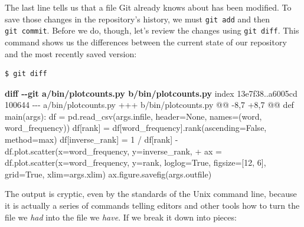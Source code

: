 \documentclass[
]{krantz}
\makeatletter
\newenvironment{Shaded}{\begin{snugshade}}{\end{snugshade}}
\newcommand{\DataTypeTok}[1]{\textcolor[rgb]{0.13,0.29,0.53}{#1}}
\newcommand{\KeywordTok}[1]{\textcolor[rgb]{0.13,0.29,0.53}{\textbf{#1}}}
\newcommand{\NormalTok}[1]{#1}
\newcommand{\StringTok}[1]{\textcolor[rgb]{0.31,0.60,0.02}{#1}}
\newcommand{\VariableTok}[1]{\textcolor[rgb]{0.00,0.00,0.00}{#1}}
\newenvironment{kframe}{%
\medskip{}
\setlength{\fboxsep}{.8em}
 \def\at@end@of@kframe{}%
 \ifinner\ifhmode%
  \def\at@end@of@kframe{\end{minipage}}%
  \begin{minipage}{\columnwidth}%
 \fi\fi%
 \def\FrameCommand##1{\hskip\@totalleftmargin \hskip-\fboxsep
 \colorbox{shadecolor}{##1}\hskip-\fboxsep
     \hskip-\linewidth \hskip-\@totalleftmargin \hskip\columnwidth}%
 \MakeFramed {\advance\hsize-\width
   \@totalleftmargin\z@ \linewidth\hsize
   \@setminipage}}%
 {\par\unskip\endMakeFramed%
 \at@end@of@kframe}
\renewenvironment{Shaded}{\begin{kframe}}{\end{kframe}}
\makeatother
\begin{document}
The last line tells us that
a file Git already knows about has been modified.
To save those changes in the repository's history,
we must \texttt{git\ add} and then \texttt{git\ commit}.
Before we do,
though,
let's review the changes using \texttt{git\ diff}.
This command shows us the differences between the current state of our repository
and the most recently saved version:

\begin{verbatim}
$ git diff
\end{verbatim}

\begin{Shaded}
\begin{Highlighting}[]
\KeywordTok{diff {-}{-}git a/bin/plotcounts.py b/bin/plotcounts.py}
\NormalTok{index 13e7f38..a6005cd 100644}
\DataTypeTok{{-}{-}{-} a/bin/plotcounts.py}
\DataTypeTok{+++ b/bin/plotcounts.py}
\DataTypeTok{@@ {-}8,7 +8,7 @@ def main(args):}
\NormalTok{     df = pd.read\_csv(args.infile, header=None, names=(\textquotesingle{}word\textquotesingle{}, \textquotesingle{}word\_frequency\textquotesingle{}))}
\NormalTok{     df[\textquotesingle{}rank\textquotesingle{}] = df[\textquotesingle{}word\_frequency\textquotesingle{}].rank(ascending=False, method=\textquotesingle{}max\textquotesingle{})}
\NormalTok{     df[\textquotesingle{}inverse\_rank\textquotesingle{}] = 1 / df[\textquotesingle{}rank\textquotesingle{}]}
\StringTok{{-}    df.plot.scatter(x=\textquotesingle{}word\_frequency\textquotesingle{}, y=\textquotesingle{}inverse\_rank\textquotesingle{},}
\VariableTok{+    ax = df.plot.scatter(x=\textquotesingle{}word\_frequency\textquotesingle{}, y=\textquotesingle{}rank\textquotesingle{}, loglog=True,}
\NormalTok{                          figsize=[12, 6], grid=True, xlim=args.xlim)}
\NormalTok{     ax.figure.savefig(args.outfile)}
\end{Highlighting}
\end{Shaded}

The output is cryptic,
even by the standards of the Unix command line,
because it is actually a series of commands telling editors and other tools
how to turn the file we \emph{had} into the file we \emph{have}.
If we break it down into pieces:
\end{document}
